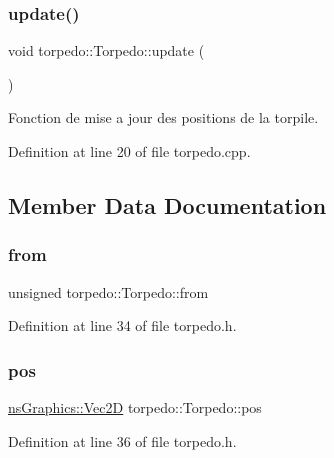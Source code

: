 \subsubsection{\texorpdfstring{update()}{update()}}
{\footnotesize\ttfamily void torpedo\+::\+Torpedo\+::update (\begin{DoxyParamCaption}{ }\end{DoxyParamCaption})}



Fonction de mise a jour des positions de la torpile. 



Definition at line 20 of file torpedo.\+cpp.



\subsection{Member Data Documentation}
\mbox{\label{structtorpedo_1_1_torpedo_a95c15be24a51cb7908ec34c1d1f431b2}} 
\subsubsection{\texorpdfstring{from}{from}}
{\footnotesize\ttfamily unsigned torpedo\+::\+Torpedo\+::from}



Definition at line 34 of file torpedo.\+h.

\mbox{\label{structtorpedo_1_1_torpedo_ae9068c94dc2a9a9484e681121526ba07}} 
\subsubsection{\texorpdfstring{pos}{pos}}
{\footnotesize\ttfamily \hyperlink{classns_graphics_1_1_vec2_d}{ns\+Graphics\+::\+Vec2D} torpedo\+::\+Torpedo\+::pos}



Definition at line 36 of file torpedo.\+h.

\mbox{\label{structtorpedo_1_1_torpedo_a583fd4c54eb71e9af5cd29de54f12ed1}} 
